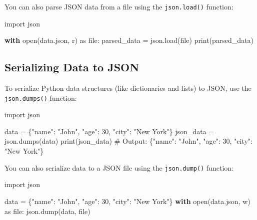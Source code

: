 \documentclass[
  letterpaper,
  DIV=11,
  numbers=noendperiod]{scrreprt}
\newenvironment{Shaded}{\begin{snugshade}}{\end{snugshade}}
\newcommand{\BuiltInTok}[1]{\textcolor[rgb]{0.00,0.23,0.31}{#1}}
\newcommand{\CommentTok}[1]{\textcolor[rgb]{0.37,0.37,0.37}{#1}}
\newcommand{\ControlFlowTok}[1]{\textcolor[rgb]{0.00,0.23,0.31}{\textbf{#1}}}
\newcommand{\DecValTok}[1]{\textcolor[rgb]{0.68,0.00,0.00}{#1}}
\newcommand{\ImportTok}[1]{\textcolor[rgb]{0.00,0.46,0.62}{#1}}
\newcommand{\NormalTok}[1]{\textcolor[rgb]{0.00,0.23,0.31}{#1}}
\newcommand{\OperatorTok}[1]{\textcolor[rgb]{0.37,0.37,0.37}{#1}}
\newcommand{\StringTok}[1]{\textcolor[rgb]{0.13,0.47,0.30}{#1}}
\begin{document}
You can also parse JSON data from a file using the \texttt{json.load()}
function:

\begin{Shaded}
\begin{Highlighting}[]
\ImportTok{import}\NormalTok{ json}

\ControlFlowTok{with} \BuiltInTok{open}\NormalTok{(}\StringTok{\textquotesingle{}data.json\textquotesingle{}}\NormalTok{, }\StringTok{\textquotesingle{}r\textquotesingle{}}\NormalTok{) }\ImportTok{as} \BuiltInTok{file}\NormalTok{:}
\NormalTok{    parsed\_data }\OperatorTok{=}\NormalTok{ json.load(}\BuiltInTok{file}\NormalTok{)}
\BuiltInTok{print}\NormalTok{(parsed\_data)}
\end{Highlighting}
\end{Shaded}

\subsection{Serializing Data to JSON}\label{serializing-data-to-json}

To serialize Python data structures (like dictionaries and lists) to
JSON, use the \texttt{json.dumps()} function:

\begin{Shaded}
\begin{Highlighting}[]
\ImportTok{import}\NormalTok{ json}

\NormalTok{data }\OperatorTok{=}\NormalTok{ \{}\StringTok{"name"}\NormalTok{: }\StringTok{"John"}\NormalTok{, }\StringTok{"age"}\NormalTok{: }\DecValTok{30}\NormalTok{, }\StringTok{"city"}\NormalTok{: }\StringTok{"New York"}\NormalTok{\}}
\NormalTok{json\_data }\OperatorTok{=}\NormalTok{ json.dumps(data)}
\BuiltInTok{print}\NormalTok{(json\_data)  }\CommentTok{\# Output: \{"name": "John", "age": 30, "city": "New York"\}}
\end{Highlighting}
\end{Shaded}

You can also serialize data to a JSON file using the
\texttt{json.dump()} function:

\begin{Shaded}
\begin{Highlighting}[]
\ImportTok{import}\NormalTok{ json}

\NormalTok{data }\OperatorTok{=}\NormalTok{ \{}\StringTok{"name"}\NormalTok{: }\StringTok{"John"}\NormalTok{, }\StringTok{"age"}\NormalTok{: }\DecValTok{30}\NormalTok{, }\StringTok{"city"}\NormalTok{: }\StringTok{"New York"}\NormalTok{\}}
\ControlFlowTok{with} \BuiltInTok{open}\NormalTok{(}\StringTok{\textquotesingle{}data.json\textquotesingle{}}\NormalTok{, }\StringTok{\textquotesingle{}w\textquotesingle{}}\NormalTok{) }\ImportTok{as} \BuiltInTok{file}\NormalTok{:}
\NormalTok{    json.dump(data, }\BuiltInTok{file}\NormalTok{)}
\end{Highlighting}
\end{Shaded}
\end{document}
